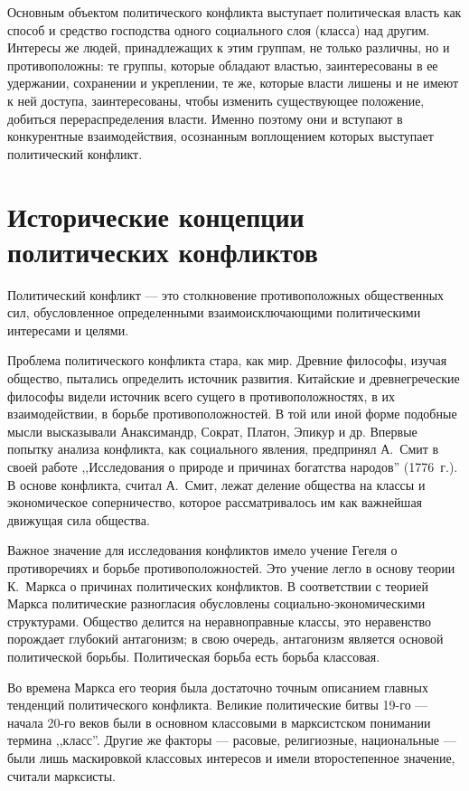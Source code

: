 \documentclass[a4paper,12pt,notitlepage,pdftex,headsepline]{scrartcl}
\begin{document}
  Основным объектом политического конфликта выступает политическая власть как
  способ и средство господства одного социального слоя (класса) над другим.
  Интересы же людей, принадлежащих к этим группам, не только различны, но и
  противоположны: те группы, которые обладают властью, заинтересованы в ее
  удержании, сохранении и укреплении, те же, которые власти лишены и не имеют
  к ней доступа, заинтересованы, чтобы изменить существующее положение,
  добиться перераспределения власти.
  Именно поэтому они и вступают в конкурентные взаимодействия, осознанным
  воплощением которых выступает политический конфликт.
  \clearpage
\section{Исторические концепции политических конфликтов}
  Политический конфликт --- это столкновение противоположных общественных сил,
  обусловленное определенными взаимоисключающими политическими интересами и
  целями.

  Проблема политического конфликта стара, как мир.
  Древние философы, изучая общество, пытались определить источник развития.
  Китайские и древнегреческие философы видели источник всего сущего в
  противоположностях, в их взаимодействии, в борьбе противоположностей.
  В той или иной форме подобные мысли высказывали Анаксимандр, Сократ, Платон,
  Эпикур и др.
  Впервые попытку анализа конфликта, как социального явления, предпринял
  А.~Смит в своей работе ,,Исследования о природе и причинах богатства
  народов'' (1776~г.).
  В основе конфликта, считал А.~Смит, лежат деление общества на классы и
  экономическое соперничество, которое рассматривалось им как важнейшая
  движущая сила общества.

  Важное значение для исследования конфликтов имело учение Гегеля о
  противоречиях и борьбе противоположностей.
  Это учение легло в основу теории К.~Маркса о причинах политических
  конфликтов.
  В соответствии с теорией Маркса политические разногласия обусловлены
  социально-экономическими структурами.
  Общество делится на неравноправные классы, это неравенство порождает
  глубокий антагонизм; в свою очередь, антагонизм является основой
  политической борьбы.
  Политическая борьба есть борьба классовая.

  Во времена Маркса его теория была достаточно точным описанием главных
  тенденций политического конфликта.
  Великие политические битвы 19-го --- начала 20-го веков были в основном
  классовыми в марксистском понимании термина ,,класс''.
  Другие же факторы --- расовые, религиозные, национальные --- были лишь
  маскировкой классовых интересов и имели второстепенное значение, считали
  марксисты.
\end{document}
